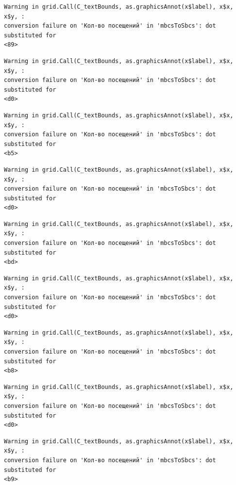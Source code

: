 \documentclass[
  letterpaper,
  DIV=11,
  numbers=noendperiod]{scrartcl}
\begin{document}
\begin{verbatim}
Warning in grid.Call(C_textBounds, as.graphicsAnnot(x$label), x$x, x$y, :
conversion failure on 'Кол-во посещений' in 'mbcsToSbcs': dot substituted for
<89>
\end{verbatim}

\begin{verbatim}
Warning in grid.Call(C_textBounds, as.graphicsAnnot(x$label), x$x, x$y, :
conversion failure on 'Кол-во посещений' in 'mbcsToSbcs': dot substituted for
<d0>
\end{verbatim}

\begin{verbatim}
Warning in grid.Call(C_textBounds, as.graphicsAnnot(x$label), x$x, x$y, :
conversion failure on 'Кол-во посещений' in 'mbcsToSbcs': dot substituted for
<b5>
\end{verbatim}

\begin{verbatim}
Warning in grid.Call(C_textBounds, as.graphicsAnnot(x$label), x$x, x$y, :
conversion failure on 'Кол-во посещений' in 'mbcsToSbcs': dot substituted for
<d0>
\end{verbatim}

\begin{verbatim}
Warning in grid.Call(C_textBounds, as.graphicsAnnot(x$label), x$x, x$y, :
conversion failure on 'Кол-во посещений' in 'mbcsToSbcs': dot substituted for
<bd>
\end{verbatim}

\begin{verbatim}
Warning in grid.Call(C_textBounds, as.graphicsAnnot(x$label), x$x, x$y, :
conversion failure on 'Кол-во посещений' in 'mbcsToSbcs': dot substituted for
<d0>
\end{verbatim}

\begin{verbatim}
Warning in grid.Call(C_textBounds, as.graphicsAnnot(x$label), x$x, x$y, :
conversion failure on 'Кол-во посещений' in 'mbcsToSbcs': dot substituted for
<b8>
\end{verbatim}

\begin{verbatim}
Warning in grid.Call(C_textBounds, as.graphicsAnnot(x$label), x$x, x$y, :
conversion failure on 'Кол-во посещений' in 'mbcsToSbcs': dot substituted for
<d0>
\end{verbatim}

\begin{verbatim}
Warning in grid.Call(C_textBounds, as.graphicsAnnot(x$label), x$x, x$y, :
conversion failure on 'Кол-во посещений' in 'mbcsToSbcs': dot substituted for
<b9>
\end{verbatim}
\end{document}
